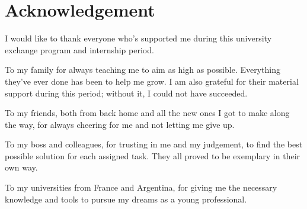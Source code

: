 \chapter*{Acknowledgement}

I would like to thank everyone who's supported me during this university exchange program and internship period.

To my family for always teaching me to aim as high as possible. Everything they've ever done has been to help me grow. I am also grateful for their material support during this period; without it, I could not have succeeded.

To my friends, both from back home and all the new ones I got to make along the way, for always cheering for me and not letting me give up.

To my boss and colleagues, for trusting in me and my judgement, to find the best possible solution for each assigned task. They all proved to be exemplary in their own way.

To my universities from France and Argentina, for giving me the necessary knowledge and tools to pursue my dreams as a young professional.